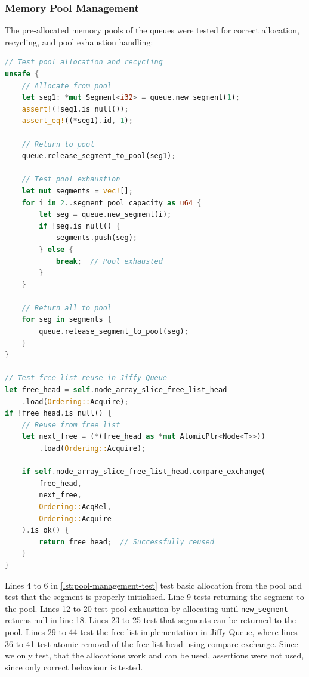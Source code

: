 \subsubsection{Memory Pool Management}
The pre-allocated memory pools of the queues were tested for correct allocation, recycling, and pool exhaustion handling:

\begin{lstlisting}[language=Rust, style=boxed, caption={Memory pool management test}, label={lst:pool-management-test}]
// Test pool allocation and recycling
unsafe {
    // Allocate from pool
    let seg1: *mut Segment<i32> = queue.new_segment(1);
    assert!(!seg1.is_null());
    assert_eq!((*seg1).id, 1);
    
    // Return to pool
    queue.release_segment_to_pool(seg1);
    
    // Test pool exhaustion
    let mut segments = vec![];
    for i in 2..segment_pool_capacity as u64 {
        let seg = queue.new_segment(i);
        if !seg.is_null() {
            segments.push(seg);
        } else {
            break;  // Pool exhausted
        }
    }
    
    // Return all to pool
    for seg in segments {
        queue.release_segment_to_pool(seg);
    }
}

// Test free list reuse in Jiffy Queue
let free_head = self.node_array_slice_free_list_head
    .load(Ordering::Acquire);
if !free_head.is_null() {
    // Reuse from free list
    let next_free = (*(free_head as *mut AtomicPtr<Node<T>>))
        .load(Ordering::Acquire);
        
    if self.node_array_slice_free_list_head.compare_exchange(
        free_head, 
        next_free, 
        Ordering::AcqRel, 
        Ordering::Acquire
    ).is_ok() {
        return free_head;  // Successfully reused
    }
}
\end{lstlisting}

Lines 4 to 6 in \cref{lst:pool-management-test} test basic allocation from the pool and test that the segment is properly initialised. Line 9 tests returning the segment to the pool. Lines 12 to 20 test pool exhaustion by allocating until \texttt{new\_segment} returns null in line 18. Lines 23 to 25 test that segments can be returned to the pool. Lines 29 to 44 test the free list implementation in Jiffy Queue, where lines 36 to 41 test atomic removal of the free list head using compare-exchange. Since we only test, that the allocations work and can be used, assertions were not used, since only correct behaviour is tested.

